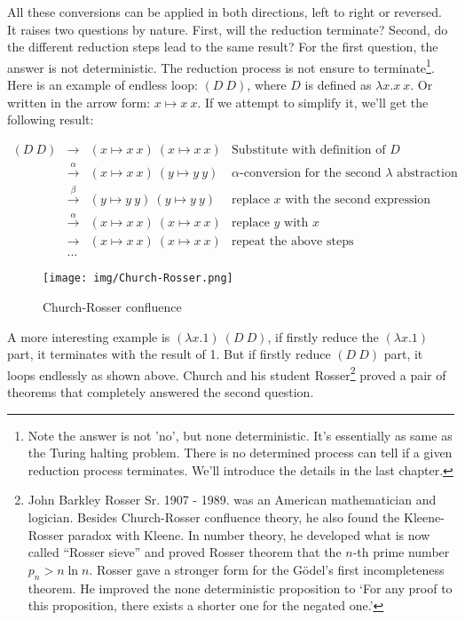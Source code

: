 \documentclass{article}
\begin{document}
All these conversions can be applied in both directions, left to right or reversed. It raises two questions by nature. First, will the reduction terminate? Second, do the different reduction steps lead to the same result? For the first question, the answer is not deterministic. The reduction process is not ensure to terminate\footnote{Note the answer is not 'no', but none deterministic. It's essentially as same as the Turing halting problem. There is no determined process can tell if a given reduction process terminates. We'll introduce the details in the last chapter.}. Here is an example of endless loop: $(D\ D)$, where $D$ is defined as $\lambda x. x\ x$. Or written in the arrow form: $x \mapsto x\ x$. If we attempt to simplify it, we'll get the following result:

\[
\begin{array}{rcll}
(D\ D) & \to & (x \mapsto x\ x)\ (x \mapsto x\ x) & \text{Substitute with definition of $D$} \\
       & \xrightarrow{\alpha} & (x \mapsto x\ x)\ (y \mapsto y\ y) & \text{$\alpha$-conversion for the second $\lambda$ abstraction} \\
       & \xrightarrow{\beta} & (y \mapsto y\ y)\ (y \mapsto y\ y) & \text{replace $x$ with the second expression} \\
       & \xrightarrow{\alpha} & (x \mapsto x\ x)\ (x \mapsto x\ x) & \text{replace $y$ with $x$} \\
       & \to & (x \mapsto x\ x)\ (x \mapsto x\ x) & \text{repeat the above steps} \\
       & ... &
\end{array}
\]

\begin{wrapfigure}{R}{0.3\textwidth}
 \centering
 \texttt{[image: img/Church-Rosser.png]}
 \caption{Church-Rosser confluence}
 \label{fig:Church-Rosser-confluence}
\end{wrapfigure}

A more interesting example is $(\lambda x . 1)\ (D\ D)$, if firstly reduce the $(\lambda x . 1)$ part, it terminates with the result of 1. But if firstly reduce $(D\ D)$ part, it loops endlessly as shown above. Church and his student Rosser\footnote{John Barkley Rosser Sr. 1907 - 1989. was an American mathematician and logician. Besides Church-Rosser confluence theory, he also found the Kleene-Rosser paradox with Kleene. In number theory, he developed what is now called ``Rosser sieve'' and proved Rosser theorem that the $n$-th prime number $p_n > n \ln n$. Rosser gave a stronger form for the  Gödel's first incompleteness theorem. He improved the none deterministic proposition to `For any proof to this proposition, there exists a shorter one for the negated one.'} proved a pair of theorems that completely answered the second question.
\end{document}
